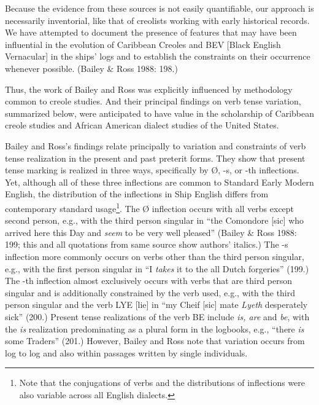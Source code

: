 \begin{styleStandard}
Because the evidence from these sources is not easily quantifiable, our approach is necessarily inventorial, like that of creolists working with early historical records. We have attempted to document the presence of features that may have been influential in the evolution of Caribbean Creoles and BEV [Black English Vernacular] in the ships’ logs and to establish the constraints on their occurrence whenever possible. (Bailey \& Ross 1988: 198.) 
\end{styleStandard}

\begin{styleStandard}
Thus, the work of Bailey and Ross was explicitly influenced by methodology common to creole studies. And their principal findings on verb tense variation, summarized below, were anticipated to have value in the scholarship of Caribbean creole studies and African American dialect studies of the United States.
\end{styleStandard}

\begin{styleStandard}
Bailey and Ross’s findings relate principally to variation and constraints of verb tense realization in the present and past preterit forms. They show that present tense marking is realized in three ways, specifically by Ø, -s, or -th inflections. Yet, although all of these three inflections are common to Standard Early Modern English, the distribution of the inflections in Ship English differs from contemporary standard usage\footnote{ Note that the conjugations of verbs and the distributions of inflections were also variable across all English dialects.}. The Ø inflection occurs with all verbs except second person, e.g., with the third person singular in “the Comondore [sic] who arrived here this Day and \textit{seem} to be very well pleased” (Bailey \& Ross 1988: 199; this and all quotations from same source show authors’ italics.) The -s inflection more commonly occurs on verbs other than the third person singular, e.g., with the first person singular in “I \textit{takes} it to the all Dutch forgeries” (199.) The -th inflection almost exclusively occurs with verbs that are third person singular and is additionally constrained by the verb used, e.g., with the third person singular and the verb LYE [lie] in “my Cheif [sic] mate\textit{ Lyeth} desperately sick” (200.) Present tense realizations of the verb BE include \textit{is, are }and\textit{ be}, with the\textit{ is} realization predominating as a plural form in the logbooks, e.g., “there \textit{is }some Traders” (201.) However, Bailey and Ross note that variation occurs from log to log and also within passages written by single individuals. 
\end{styleStandard}

